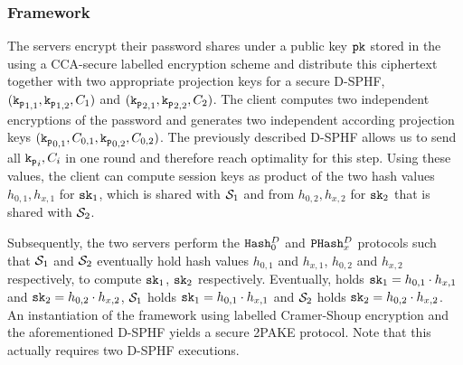 \subsubsection{Framework}
The servers encrypt their password shares under a public key $\mathtt{pk}$ stored in the \crs using a \ac{CCA}-secure labelled encryption scheme and distribute this ciphertext together with two appropriate projection keys for a secure \ac{D-SPHF}, $(\mathtt{k_p}_{1,1},\mathtt{k_p}_{1,2},C_1)$ and $(\mathtt{k_p}_{2,1},\mathtt{k_p}_{2,2},C_2)$.
The client computes two independent encryptions of the password and generates two independent according projection keys $(\mathtt{k_p}_{0,1},C_{0,1},\mathtt{k_p}_{0,2},C_{0,2})$.
The previously described \ac{D-SPHF} allows us to send all $\mathtt{k_p}_i,C_i$ in one round and therefore reach optimality for this step.
Using these values, the client can compute session keys as product of the two hash values $h_{0,1},h_{x,1}$ for $\mathtt{sk}_1$, which is shared with $\mathcal{S}_1$ and from $h_{0,2},h_{x,2}$ for $\mathtt{sk}_2$ that is shared with $\mathcal{S}_2$.

Subsequently, the two servers perform the $\mathtt{Hash}_0^D$ and $\mathtt{PHash}_x^D$ protocols such that $\mathcal{S}_1$ and $\mathcal{S}_2$ eventually hold hash values $h_{0,1}$ and $h_{x,1}$, $h_{0,2}$ and $h_{x,2}$ respectively, to compute $\mathtt{sk}_1$, $\mathtt{sk}_2$ respectively.
Eventually, \Client holds $\mathtt{sk}_1=h_{0,1}\cdot h_{x,1}$ and $\mathtt{sk}_2=h_{0,2}\cdot h_{x,2}$, $\mathcal{S}_1$ holds $\mathtt{sk}_1=h_{0,1}\cdot h_{x,1}$ and $\mathcal{S}_2$ holds $\mathtt{sk}_2=h_{0,2}\cdot h_{x,2}$.
An instantiation of the framework using labelled Cramer-Shoup encryption and the aforementioned \ac{D-SPHF} yields a secure \ac{2PAKE} protocol.
Note that this actually requires two \ac{D-SPHF} executions.

